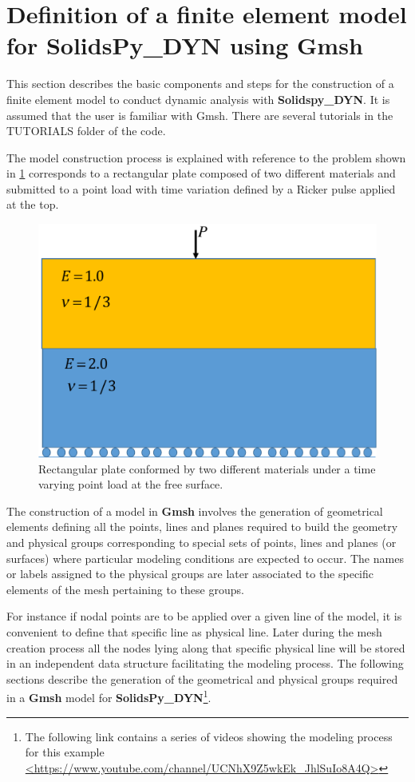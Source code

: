 \documentclass[11pt,letterpaper]{article}
\begin{document}
\section{Definition of a finite element model for SolidsPy\_DYN using Gmsh}

This section describes the basic components and steps for the construction of a finite element model to conduct dynamic analysis with {\bf Solidspy\_DYN}. It is assumed that the user is familiar with Gmsh. There are several tutorials in the TUTORIALS folder of the code. 

The model construction process is explained with reference to the problem shown in \cref{fig:placa}  corresponds to a rectangular plate composed of two different materials  and submitted to a point load with time variation defined by a Ricker pulse applied at the top.

\begin{figure}[h]
  \centering
  \includegraphics[width=8 cm]{img/placa.pdf}
  \caption{Rectangular plate conformed by two different materials under a time varying point load at the free surface.}
  \label{fig:placa}
\end{figure}

The construction of a model in {\bf Gmsh} involves the generation of geometrical elements defining all the points, lines and planes required to build the geometry and physical groups corresponding to special sets of points, lines and planes (or surfaces) where particular modeling conditions are expected to occur. The names or labels assigned to the physical groups are later associated to the specific elements of the mesh pertaining to these groups.

For instance if nodal points are to be applied over a given line of the model, it is convenient to define that specific line as physical line. Later during the mesh creation process all the nodes lying along that specific physical line will be stored in an independent data structure facilitating the modeling process. The following sections describe the generation of the geometrical and physical groups required in a {\bf Gmsh} model for {\bf SolidsPy\_DYN}\footnote{The following link contains a series of videos showing the modeling process for this example \url{<https://www.youtube.com/channel/UCNhX9Z5wkEk_JhlSuIo8A4Q>}}.
\end{document}
